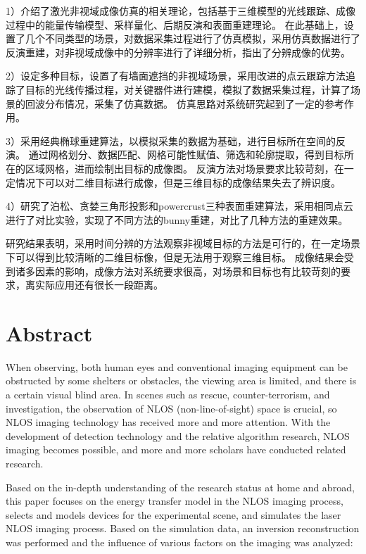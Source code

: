 1）介绍了激光非视域成像仿真的相关理论，包括基于三维模型的光线跟踪、成像过程中的能量传输模型、采样量化、后期反演和表面重建理论。
在此基础上，设置了几个不同类型的场景，对数据采集过程进行了仿真模拟，采用仿真数据进行了反演重建，对非视域成像中的分辨率进行了详细分析，指出了分辨成像的优势。

2）设定多种目标，设置了有墙面遮挡的非视域场景，采用改进的点云跟踪方法追踪了目标的光线传播过程，对关键器件进行建模，模拟了数据采集过程，计算了场景的回波分布情况，采集了仿真数据。
仿真思路对系统研究起到了一定的参考作用。

3）采用经典椭球重建算法，以模拟采集的数据为基础，进行目标所在空间的反演。
通过网格划分、数据匹配、网格可能性赋值、筛选和轮廓提取，得到目标所在的区域网格，进而绘制出目标的成像图。
反演方法对场景要求比较苛刻，在一定情况下可以对二维目标进行成像，但是三维目标的成像结果失去了辨识度。

4）研究了泊松、贪婪三角形投影和powercrust三种表面重建算法，采用相同点云进行了对比实验，实现了不同方法的bunny重建，对比了几种方法的重建效果。

研究结果表明，采用时间分辨的方法观察非视域目标的方法是可行的，在一定场景下可以得到比较清晰的二维目标像，但是无法用于观察三维目标。
成像结果会受到诸多因素的影响，成像方法对系统要求很高，对场景和目标也有比较苛刻的要求，离实际应用还有很长一段距离。



\chapter*{Abstract}%

When observing, both human eyes and conventional imaging equipment can be obstructed by some shelters or obstacles, the viewing area is limited, and there is a certain visual blind area.
 In scenes such as rescue, counter-terrorism, and investigation, the observation of NLOS (non-line-of-sight) space is crucial, so NLOS imaging technology has received more and more attention.
 With the development of detection technology and the relative algorithm research, NLOS imaging becomes possible, and more and more scholars have conducted related research.

Based on the in-depth understanding of the research status at home and abroad, this paper focuses on the energy transfer model in the NLOS imaging process, selects and models devices for the experimental scene, and simulates the laser NLOS imaging process.
 Based on the simulation data, an inversion reconstruction was performed and the influence of various factors on the imaging was analyzed:

